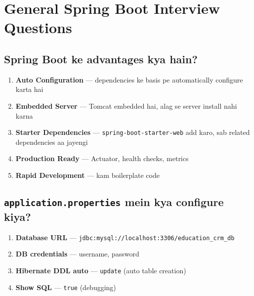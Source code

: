 \documentclass[12pt,a4paper]{article}
\begin{document}
\section{General Spring Boot Interview Questions}

\setcounter{subsection}{20}

\subsection{Spring Boot ke advantages kya hain?}

\begin{answerbox}
\begin{enumerate}
    \item \textbf{Auto Configuration} --- dependencies ke basis pe automatically configure karta hai
    \item \textbf{Embedded Server} --- Tomcat embedded hai, alag se server install nahi karna
    \item \textbf{Starter Dependencies} --- \texttt{spring-boot-starter-web} add karo, sab related dependencies aa jayengi
    \item \textbf{Production Ready} --- Actuator, health checks, metrics
    \item \textbf{Rapid Development} --- kam boilerplate code
\end{enumerate}
\end{answerbox}

\subsection{\texttt{application.properties} mein kya configure kiya?}

\begin{answerbox}
\begin{enumerate}
    \item \textbf{Database URL} --- \texttt{jdbc:mysql://localhost:3306/education\_crm\_db}
    \item \textbf{DB credentials} --- username, password
    \item \textbf{Hibernate DDL auto} --- \texttt{update} (auto table creation)
    \item \textbf{Show SQL} --- \texttt{true} (debugging)
\end{enumerate}
\end{answerbox}
\end{document}

